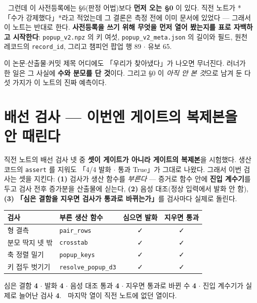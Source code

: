 \documentclass{article}
\begin{document}
🔴 그런데 이 사전등록에는 \S 6(판정 어법)보다 \textbf{먼저 오는 \S 0} 이 있다.
직전 노트가 *「수가 강제했다」*라고 적었는데 그 결론은 측정 전에 이미 문서에 있었다 ---
그래서 이 노트는 반대로 한다. \textbf{사전등록을 쓰기 위해 무엇을 먼저 열어 봤는지를
표로 자백하고 시작한다}: \texttt{popup\_v2.npz} 의 키 여섯,
\texttt{popup\_v2\_meta.json} 의 길이와 필드, 원천 레코드의 \texttt{record\_id},
그리고 챔피언 팝업 행 89 $\cdot$ 유보 65.

{이 논문$\cdot$산출물$\cdot$커밋 제목 어디에도 「우리가 찾아냈다」가 나오면 무너진다.}
러너가 한 일은 그 사실에 \textbf{수와 분모를 단 것}이다.
그리고 \S 0 이 \emph{아직 안 본 것}으로 남겨 둔 다섯 가지가 이 노트의 진짜 예측이다.

\section{배선 검사 --- 이번엔 게이트의 복제본을 안 때린다}

직전 노트의 배선 검사 넷 중 \textbf{셋이 게이트가 아니라 게이트의 복제본}을 시험했다.
생산 코드의 \texttt{assert} 를 지워도 「4/4 발화 $\cdot$ 통과 True」가 그대로 나왔다.
그래서 이번 검사는 셋을 지킨다: \textbf{(1)} 검사가 생산 함수를 \emph{부른다} ---
증거로 함수 안에 \textbf{진입 계수기}를 두고 검사 전후 증가분을 산출물에 싣는다,
\textbf{(2)} 음성 대조(정상 입력에서 발화 안 함),
\textbf{(3)} \textbf{「심은 결함을 지우면 검사가 통과로 바뀌는가」}를 검사마다 실제로 돌린다.

\begin{center}
\begin{tabular}{llcc}
\toprule
검사 & 부른 생산 함수 & 심으면 발화 & 지우면 통과 \\
\midrule
형 결측 & \texttt{pair\_rows} & ✓ & ✓ \\
분모 딱지 넷 밖 & \texttt{crosstab} & ✓ & ✓ \\
축 정렬 밀기 & \texttt{popup\_keys} & ✓ & ✓ \\
키 접두 벗기기 & \texttt{resolve\_popup\_d3} & ✓ & ✓ \\
\bottomrule
\end{tabular}
\end{center}

심은 결함 \textbf{4} $\cdot$ 발화 \textbf{4} $\cdot$ 음성 대조 통과 \textbf{4} $\cdot$
지우면 통과로 바뀐 수 \textbf{4} $\cdot$ 진입 계수기가 실제로 늘어난 검사 \textbf{4}.
🔴 마지막 열이 직전 노트에 없던 열이다.
\end{document}
